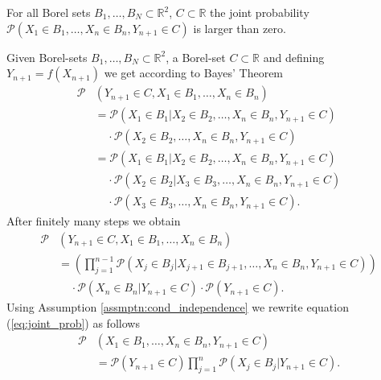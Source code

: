   \begin{myAssmptn}\label{assmptn:joint_prob}
    For all Borel sets $B_{1}, \ldots, B_{N}\subset\mathbb{R}^{2}$, $C\subset\mathbb{R}$ the joint probability 
		$\mathcal{P}(X_{1}\in B_{1}, \ldots, X_{n}\in B_{n}, Y_{n + 1}\in C)$ is larger than zero.
	\end{myAssmptn}

	
	Given Borel-sets $B_{1}, \ldots, B_{N}\subset\mathbb{R}^{2}$, a Borel-set $C\subset\mathbb{R}$ and defining $Y_{n + 1} = f(X_{n + 1})$ 
	we get according to Bayes' Theorem
	\begin{align*}
	  \mathcal{P}&(Y_{n + 1}\in C, X_{1}\in B_{1}, \ldots, X_{n}\in B_{n}) \\
			&= \mathcal{P}(X_{1}\in B_{1}|X_{2}\in B_{2}, \ldots, X_{n}\in B_{n}, Y_{n + 1}\in C) \\ 
						& ~~~~~ \cdot	\mathcal{P}(X_{2}\in B_{2}, \ldots, X_{n}\in B_{n}, Y_{n + 1}\in C) \\
			&= \mathcal{P}(X_{1}\in B_{1}|X_{2}\in B_{2}, \ldots, X_{n}\in B_{n}, Y_{n + 1}\in C) \\
						& ~~~~~ \cdot \mathcal{P}(X_{2}\in B_{2}|X_{3}\in B_{3}, \ldots, X_{n}\in B_{n}, Y_{n + 1}\in C) \\
						& ~~~~~ \cdot \mathcal{P}(X_{3}\in B_{3}, \ldots, X_{n}\in B_{n}, Y_{n + 1}\in C).
	\end{align*}
  After finitely many steps we obtain
	\begin{align}\label{eq:joint_prob}
	  \mathcal{P}&(Y_{n + 1}\in C, X_{1}\in B_{1}, \ldots, X_{n}\in B_{n}) \nonumber\\
			&=(\prod_{j = 1}^{n - 1}\mathcal{P}(X_{j}\in B_{j}|X_{j + 1}\in B_{j + 1}, \ldots, X_{n}\in B_{n}, Y_{n + 1}\in C)) \nonumber\\
						& ~~~~~	\cdot\mathcal{P}(X_{n}\in B_{n}|Y_{n + 1}\in C)\cdot\mathcal{P}(Y_{n + 1}\in C).
	\end{align}
	Using Assumption \ref{assmptn:cond_independence} we rewrite equation (\ref{eq:joint_prob}) as follows
	\begin{align*}
		\mathcal{P}&(X_{1}\in B_{1}, \ldots, X_{n}\in B_{n}, Y_{n + 1}\in C) \\
			&= \mathcal{P}(Y_{n + 1}\in C)\prod_{j = 1}^{n}\mathcal{P}(X_{j}\in B_{j}|Y_{n + 1}\in C).
	\end{align*}
